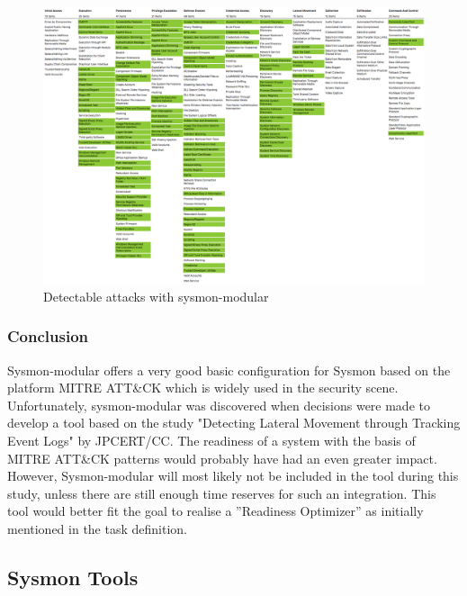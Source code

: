 \begin{figure}[H]
    \centering
    \includegraphics[width=1\linewidth]{assets/sysmon-modular/sysmon-modular.png}
    \caption{Detectable attacks with sysmon-modular}\label{fig:sysmonmodular}
\end{figure}

\subsubsection{Conclusion}
Sysmon-modular offers a very good basic configuration for Sysmon based on the platform MITRE ATT\&CK which is widely used in the security scene. Unfortunately, sysmon-modular was discovered when decisions were made to develop a tool based on the study "Detecting Lateral Movement through Tracking Event Logs" by JPCERT/CC. The readiness of a system with the basis of MITRE ATT\&CK patterns would probably have had an even greater impact. However, Sysmon-modular will most likely not be included in the tool during this study, unless there are still enough time reserves for such an integration. This tool would better fit the goal to realise a ''Readiness Optimizer'' as initially mentioned in the task definition.

\subsection{Sysmon Tools}
